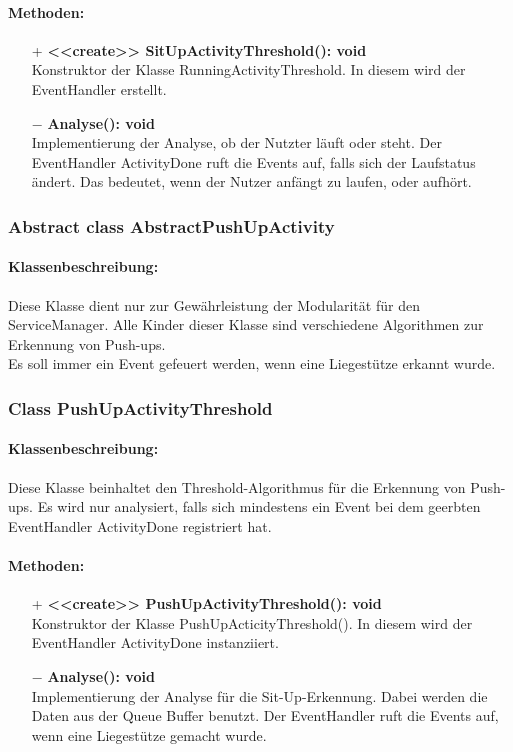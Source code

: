 \documentclass[a4paper,12pt]{article}
\begin{document}
	\paragraph{Methoden:}
	\begin{itemize}
		\item [+]\textbf{<<create>> SitUpActivityThreshold(): void}\\Konstruktor der Klasse RunningActivityThreshold. In diesem wird der EventHandler erstellt.
		\item [$-$]\textbf{Analyse(): void}\\Implementierung der Analyse, ob der Nutzter läuft oder steht. Der EventHandler ActivityDone ruft die Events auf, falls sich der Laufstatus ändert. Das bedeutet, wenn der Nutzer anfängt zu laufen, oder aufhört. 
	\end{itemize}
	
	
	\subsubsection{Abstract class AbstractPushUpActivity}
	\paragraph{Klassenbeschreibung:}
	Diese Klasse dient nur zur Gewährleistung der Modularität für den ServiceManager. Alle Kinder dieser Klasse sind verschiedene Algorithmen zur Erkennung von Push-ups.\\ Es soll immer ein Event gefeuert werden, wenn eine Liegestütze erkannt wurde.
	
	\subsubsection{Class PushUpActivityThreshold}
	\paragraph{Klassenbeschreibung:}
	Diese Klasse beinhaltet den Threshold-Algorithmus für die Erkennung von Push-ups. Es wird nur analysiert, falls sich mindestens ein Event bei dem geerbten EventHandler ActivityDone registriert hat.
	\paragraph{Methoden:}
	\begin{itemize}
		\item [+]\textbf{<<create>> PushUpActivityThreshold(): void}\\Konstruktor der Klasse PushUpActicityThreshold(). In diesem wird der EventHandler ActivityDone instanziiert. 
		\item [$-$]\textbf{Analyse(): void}\\Implementierung der Analyse für die Sit-Up-Erkennung. Dabei werden die Daten aus der Queue Buffer benutzt. Der EventHandler ruft die Events auf, wenn eine Liegestütze gemacht wurde.
	\end{itemize}
\end{document}

